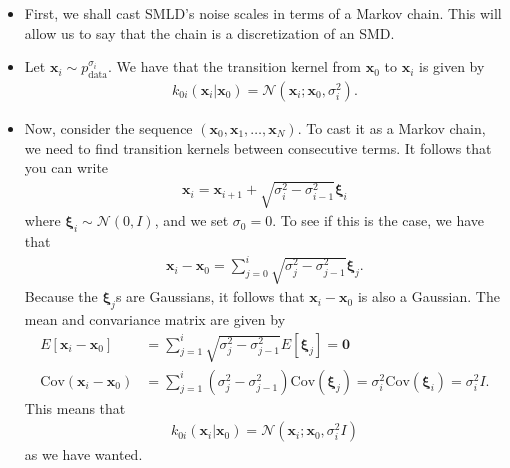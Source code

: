 \documentclass[10pt]{article}
\newcommand{\Cov}{\mathrm{Cov}}
\newcommand{\ve}[1]{\mathbf{#1}}
\newcommand{\mrm}[1]{\mathrm{#1}}
\newcommand{\ves}[1]{\boldsymbol{#1}}
\newcommand{\mcal}[1]{\mathcal{#1}}
\begin{document}
\begin{itemize}
  \item First, we shall cast SMLD's noise scales in terms of a Markov chain. This will allow us to say that the chain is a discretization of an SMD.
  
  \item Let $\ve{x}_i \sim p_{\mrm{data}}^{\sigma_i}$. We have that the transition kernel from $\ve{x}_0$ to $\ve{x}_i$ is given by
  \begin{align*}
    k_{0i}(\ve{x}_i | \ve{x}_0) = \mcal{N}(\ve{x}_i;\ve{x}_0, \sigma_i^2).
  \end{align*}

  \item Now, consider the sequence $(\ve{x}_0, \ve{x}_1, \dotsc, \ve{x}_N)$. To cast it as a Markov chain, we need to find transition kernels between consecutive terms. It follows that you can write
  \begin{align*}
    \ve{x}_i = \ve{x}_{i+1} + \sqrt{\sigma_i^2 - \sigma_{i-1}^2} \ves{\xi}_i
  \end{align*}
  where $\ves{\xi}_i \sim \mcal{N}(0,I)$, and we set $\sigma_0 = 0$. To see if this is the case, we have that
  \begin{align} \label{eqn:smld-markov-chain}
    \ve{x}_{i} - \ve{x}_0 = \sum_{j=0}^i \sqrt{\sigma_j^2 - \sigma_{j-1}^2 } \ves{\xi}_j.
  \end{align}
  Because the $\ves{\xi}_j$s are Gaussians, it follows that $\ve{x}_i - \ve{x}_0$ is also a Gaussian. The mean and convariance matrix are given by
  \begin{align*}
    E[\ve{x}_i - \ve{x}_0] &= \sum_{j=1}^i \sqrt{\sigma_j^2 - \sigma_{j-1}^2 } E[\ves{\xi}_j] = \ve{0} \\
    \Cov(\ve{x}_i - \ve{x}_0)
    &= \sum_{j=1}^i (\sigma_j^2 - \sigma_{j-1}^2) \Cov(\ves{\xi}_j) = \sigma_i^2 \Cov(\ves{\xi}_i) = \sigma_i^2 I.
  \end{align*}
  This means that
  \begin{align*}
    k_{0i}(\ve{x}_i|\ve{x}_0) = \mcal{N}(\ve{x}_i; \ve{x}_0, \sigma^2_i I)
  \end{align*}
  as we have wanted.


\end{itemize}
\end{document}
